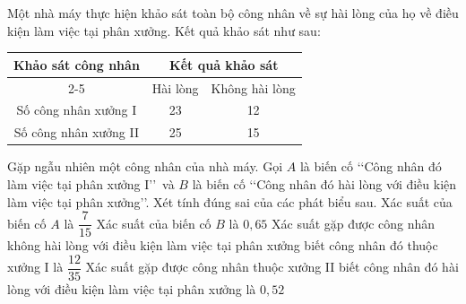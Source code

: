 \begin{ex}%
	Một nhà máy thực hiện khảo sát toàn bộ công nhân về sự hài lòng của họ về điều kiện làm việc tại phân xưởng. Kết quả khảo sát như sau:
	\begin{center}
		\begin{tabular}{|c|ccll|}
			\hline
			\multirow{2}{*}{Khảo sát công nhân} & \multicolumn{4}{c|}{Kết quả khảo sát}                               \\ \cline{2-5} 
			& \multicolumn{1}{c|}{Hài lòng} & \multicolumn{3}{c|}{Không hài lòng} \\ \hline
			Số công nhân xưởng I                & \multicolumn{1}{c|}{23}       & \multicolumn{3}{c|}{12}             \\ \hline
			Số công nhân xưởng II               & \multicolumn{1}{c|}{25}       & \multicolumn{3}{c|}{15}             \\ \hline
		\end{tabular}
	\end{center}
	Gặp ngẫu nhiên một công nhân của nhà máy. Gọi $A$ là biến cố \lq\lq Công nhân đó làm việc tại phân xưởng I\rq\rq \, và $B$ là biến cố \lq\lq Công nhân đó hài lòng với điều kiện làm việc tại phân xưởng\rq\rq. Xét tính đúng sai của các phát biểu sau.
	\choiceTF
	{\True Xác suất của biến cố $A$ là $\dfrac{7}{15}$}
	{Xác suất của biến cố $B$ là $0{,}65$}
	{\True Xác suất gặp được công nhân không hài lòng với điều kiện làm việc tại phân xưởng biết công nhân đó thuộc xưởng I là $\dfrac{12}{35}$}
	{Xác suất gặp được công nhân thuộc xưởng II biết công nhân đó hài lòng với điều kiện làm việc tại phân xưởng là $0{,}52$}
\end{ex}

